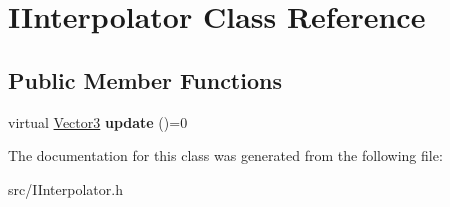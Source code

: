 \hypertarget{classIInterpolator}{\section{I\-Interpolator Class Reference}
\label{classIInterpolator}
}
\subsection*{Public Member Functions}
\begin{DoxyCompactItemize}
\item 
\hypertarget{classIInterpolator_ae808dd40665d235fa0abfadf0aa8d0d1}{virtual \hyperlink{classVectormath_1_1Aos_1_1Vector3}{Vector3} {\bfseries update} ()=0}\label{classIInterpolator_ae808dd40665d235fa0abfadf0aa8d0d1}

\end{DoxyCompactItemize}


The documentation for this class was generated from the following file\-:\begin{DoxyCompactItemize}
\item 
src/I\-Interpolator.\-h\end{DoxyCompactItemize}
